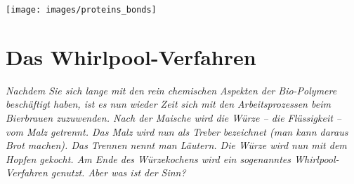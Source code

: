 \documentclass{scrartcl}  %
\begin{document}
			
			\begin{center}
				\texttt{[image: images/proteins\_bonds]}
			\end{center}
			
\newpage
	\section{Das Whirlpool-Verfahren}
	
		\textit{Nachdem Sie sich lange mit den rein chemischen Aspekten der Bio-Polymere beschäftigt haben, ist es nun wieder Zeit sich mit den Arbeitsprozessen beim Bierbrauen zuzuwenden. Nach der Maische wird die Würze – die Flüssigkeit – vom Malz getrennt. Das Malz wird nun als Treber bezeichnet (man kann daraus Brot machen). Das Trennen nennt man Läutern. Die Würze wird nun mit dem Hopfen gekocht. Am Ende des Würzekochens wird ein sogenanntes Whirlpool-Verfahren genutzt. Aber was ist der Sinn?} \newline
	
\end{document}
